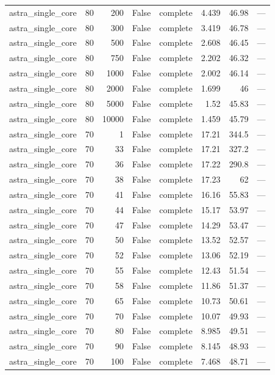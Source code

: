 \begin{tabular}{lrrrlrrl}
astra\_single\_core & 80 & 200 & False & complete & 4.439 & 46.98 & — \\
astra\_single\_core & 80 & 300 & False & complete & 3.419 & 46.78 & — \\
astra\_single\_core & 80 & 500 & False & complete & 2.608 & 46.45 & — \\
astra\_single\_core & 80 & 750 & False & complete & 2.202 & 46.32 & — \\
astra\_single\_core & 80 & 1000 & False & complete & 2.002 & 46.14 & — \\
astra\_single\_core & 80 & 2000 & False & complete & 1.699 & 46 & — \\
astra\_single\_core & 80 & 5000 & False & complete & 1.52 & 45.83 & — \\
astra\_single\_core & 80 & 10000 & False & complete & 1.459 & 45.79 & — \\
astra\_single\_core & 70 & 1 & False & complete & 17.21 & 344.5 & — \\
astra\_single\_core & 70 & 33 & False & complete & 17.21 & 327.2 & — \\
astra\_single\_core & 70 & 36 & False & complete & 17.22 & 290.8 & — \\
astra\_single\_core & 70 & 38 & False & complete & 17.23 & 62 & — \\
astra\_single\_core & 70 & 41 & False & complete & 16.16 & 55.83 & — \\
astra\_single\_core & 70 & 44 & False & complete & 15.17 & 53.97 & — \\
astra\_single\_core & 70 & 47 & False & complete & 14.29 & 53.47 & — \\
astra\_single\_core & 70 & 50 & False & complete & 13.52 & 52.57 & — \\
astra\_single\_core & 70 & 52 & False & complete & 13.06 & 52.19 & — \\
astra\_single\_core & 70 & 55 & False & complete & 12.43 & 51.54 & — \\
astra\_single\_core & 70 & 58 & False & complete & 11.86 & 51.37 & — \\
astra\_single\_core & 70 & 65 & False & complete & 10.73 & 50.61 & — \\
astra\_single\_core & 70 & 70 & False & complete & 10.07 & 49.93 & — \\
astra\_single\_core & 70 & 80 & False & complete & 8.985 & 49.51 & — \\
astra\_single\_core & 70 & 90 & False & complete & 8.145 & 48.93 & — \\
astra\_single\_core & 70 & 100 & False & complete & 7.468 & 48.71 & — \\

\end{tabular}
